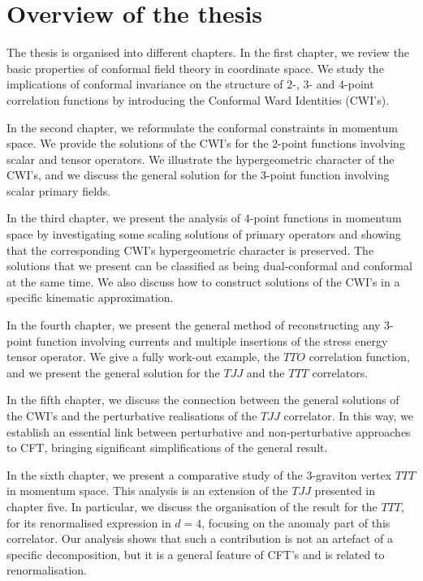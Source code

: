 \documentclass[a4paper,11pt,openright,twoside]{book}
\numberwithin{equation}{section}
\begin{document}
\section*{Overview of the thesis}
The thesis is organised into different chapters. 
In the first chapter, we review the basic properties of conformal field theory in coordinate space. We study the implications of conformal invariance on the structure of $2$-, $3$- and $4$-point correlation functions by introducing the Conformal Ward Identities (CWI's). 

In the second chapter, we reformulate the conformal constraints in momentum space. We provide the solutions of the CWI's for the $2$-point functions involving scalar and tensor operators. We illustrate the hypergeometric character of the CWI's, and we discuss the general solution for the $3$-point function involving scalar primary fields. 

In the third chapter, we present the analysis of $4$-point functions in momentum space by investigating some scaling solutions of primary operators and showing that the corresponding CWI's hypergeometric character is preserved. The solutions that we present can be classified as being dual-conformal and conformal at the same time. We also discuss how to construct solutions of the CWI's in a specific kinematic approximation. 

In the fourth chapter, we present the general method of reconstructing any $3$-point function involving currents and multiple insertions of the stress energy tensor operator. We give a fully work-out example, the $TTO$ correlation function, and we present the general solution for the $TJJ$ and the $TTT$ correlators. 

In the fifth chapter, we discuss the connection between the general solutions of the CWI's and the perturbative realisations of the $TJJ$ correlator. In this way, we establish an essential link between perturbative and non-perturbative approaches to CFT, bringing significant simplifications of the general result. 

In the sixth chapter, we present a comparative study of the $3$-graviton vertex $TTT$ in momentum space. This analysis is an extension of the $TJJ$ presented in chapter five. In particular, we discuss the organisation of the result for the $TTT$, for its renormalised expression in $d=4$, focusing on the anomaly part of this correlator. Our analysis shows that such a contribution is not an artefact of a specific decomposition, but it is a general feature of CFT's and is related to renormalisation. 
\end{document}
